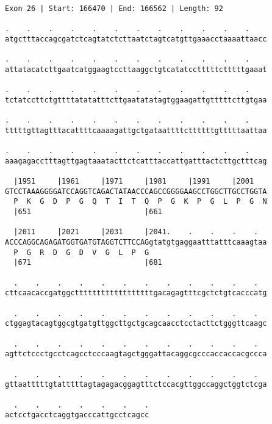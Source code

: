 \documentclass{article}
\begin{document}
\newpage
\begin{Verbatim}
Exon 26 | Start: 166470 | End: 166562 | Length: 92
 
.    .    .    .    .    .    .    .    .    .    .    .    
atgctttaccagcgatctcagtatctcttaatctagtcatgttgaaacctaaaattaacc
  
.    .    .    .    .    .    .    .    .    .    .    .    
attatacatcttgaatcatggaagtccttaaggctgtcatatcctttttctttttgaaat
  
.    .    .    .    .    .    .    .    .    .    .    .    
tctatccttctgttttatatatttcttgaatatatagtggaagattgtttttcttgtgaa
  
.    .    .    .    .    .    .    .    .    .    .    .    
tttttgttagtttacattttcaaaagattgctgataattttcttttttgtttttaattaa
  
.    .    .    .    .    .    .    .    .    .    .    .    
aaagagacctttagttgagtaaatacttctcatttaccattgatttactcttgctttcag
  
  |1951     |1961     |1971     |1981     |1991     |2001   
GTCCTAAAGGGGATCCAGGTCAGACTATAACCCAGCCGGGGAAGCCTGGCTTGCCTGGTA
  P  K  G  D  P  G  Q  T  I  T  Q  P  G  K  P  G  L  P  G  N
  |651                          |661                        
  
  |2011     |2021     |2031     |2041.    .    .    .    .  
ACCCAGGCAGAGATGGTGATGTAGGTCTTCCAGgtatgtgaggaatttatttcaaagtaa
  P  G  R  D  G  D  V  G  L  P  G                           
  |671                          |681                        
  
  .    .    .    .    .    .    .    .    .    .    .    .  
cttcaacaccgatggcttttttttttttttttttgacagagtttcgctctgtcacccatg
  
  .    .    .    .    .    .    .    .    .    .    .    .  
ctggagtacagtggcgtgatgttggcttgctgcagcaacctcctacttctgggttcaagc
  
  .    .    .    .    .    .    .    .    .    .    .    .  
agttctccctgcctcagcctcccaagtagctgggattacaggcgcccaccaccacgccca
  
  .    .    .    .    .    .    .    .    .    .    .    .  
gttaatttttgtatttttagtagagacggagtttctccacgttggccaggctggtctcga
  
  .    .    .    .    .    .    .
actcctgacctcaggtgacccattgcctcagcc
\end{Verbatim}
\newpage
\end{document}
